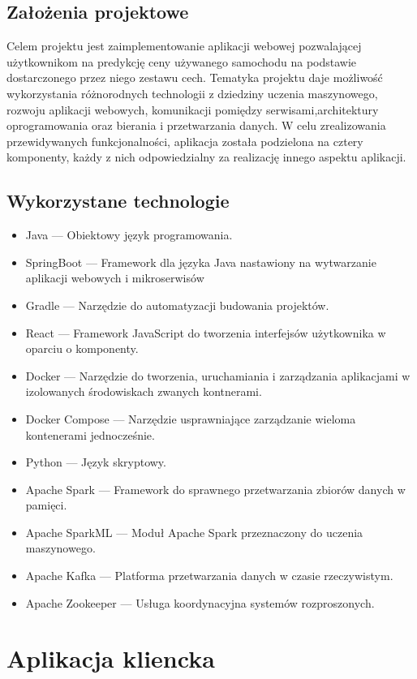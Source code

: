 \documentclass[12pt, a4paper]{report}
\begin{document}
\section{Założenia projektowe}
Celem projektu jest zaimplementowanie aplikacji webowej pozwalającej użytkownikom na predykcję 
ceny używanego samochodu na podstawie dostarczonego przez niego zestawu cech. Tematyka projektu
daje możliwość wykorzystania różnorodnych technologii z dziedziny uczenia maszynowego, rozwoju
aplikacji webowych, komunikacji pomiędzy serwisami,architektury oprogramowania oraz bierania i 
przetwarzania danych. W celu zrealizowania przewidywanych funkcjonalności, aplikacja została
podzielona na cztery komponenty, każdy z nich odpowiedzialny za realizację innego aspektu
aplikacji.
\section{Wykorzystane technologie}
\begin{itemize}
    \item Java --- Obiektowy język programowania.
    \item SpringBoot --- Framework dla języka Java nastawiony na wytwarzanie aplikacji webowych i mikroserwisów
    \item Gradle --- Narzędzie do automatyzacji budowania projektów.
    \item React --- Framework JavaScript do tworzenia interfejsów użytkownika w oparciu o komponenty.
    \item Docker --- Narzędzie do tworzenia, uruchamiania i zarządzania aplikacjami w izolowanych środowiskach zwanych kontnerami.
    \item Docker Compose --- Narzędzie usprawniające zarządzanie wieloma kontenerami jednocześnie.
    \item Python --- Język skryptowy. 
    \item Apache Spark --- Framework do sprawnego przetwarzania zbiorów danych w pamięci.
    \item Apache SparkML --- Moduł Apache Spark przeznaczony do uczenia maszynowego.
    \item Apache Kafka --- Platforma przetwarzania danych w czasie rzeczywistym.
    \item Apache Zookeeper --- Usługa koordynacyjna systemów rozproszonych.
\end{itemize}

\chapter{Aplikacja kliencka}
\end{document}
